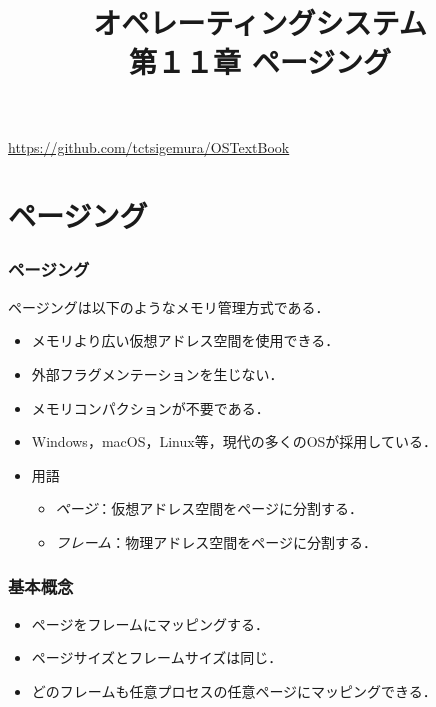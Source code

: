 \documentclass[unicode,handout]{beamer}                   %
\begin{document}
\title[ページング]
      {オペレーティングシステム\\第１１章 ページング}
\date{}
\begin{frame}
  \titlepage
  \centerline{\url{https://github.com/tctsigemura/OSTextBook}}
\end{frame}


\section{ページング}
\begin{frame}
  \frametitle{ページング}
  ページングは以下のようなメモリ管理方式である．
  \begin{itemize}
  \item メモリより広い仮想アドレス空間を使用できる．
  \item 外部フラグメンテーションを生じない．
  \item メモリコンパクションが不要である．
  \item Windows，macOS，Linux等，現代の多くのOSが採用している．
  \item 用語
    \begin{itemize}
      \item \emph{ページ}：仮想アドレス空間をページに分割する．
      \item \emph{フレーム}：物理アドレス空間をページに分割する．
    \end{itemize}
  \end{itemize}
\end{frame}

\begin{frame}
  \frametitle{基本概念}
  \begin{itemize}
  \item ページをフレームにマッピングする．
  \item ページサイズとフレームサイズは同じ．
  \item どのフレームも任意プロセスの任意ページにマッピングできる．
  \end{itemize}
\end{frame}
\end{document}
